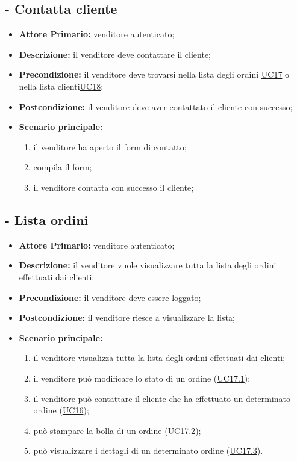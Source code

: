 
\stepUserCase
\subsection{ - Contatta cliente}
\begin{itemize}
    \item \textbf{Attore Primario:} venditore autenticato;
    \item \textbf{Descrizione:} il venditore deve contattare il cliente;
    \item \textbf{Precondizione:} il venditore deve trovarsi nella lista degli ordini \hyperref[UC17]{UC17} o nella lista clienti\hyperref[UC18]{UC18};
    \item \textbf{Postcondizione:} il venditore deve aver contattato il cliente con successo;
    \item \textbf{Scenario principale:}
    \begin{enumerate}
        \item il venditore ha aperto il form di contatto;
        \item compila il form;
        \item il venditore contatta con successo il cliente;
    \end{enumerate}
\end{itemize}

\stepUserCase
\subsection{ - Lista ordini}
\begin{itemize}
    \item \textbf{Attore Primario:} venditore autenticato;
    \item \textbf{Descrizione:} il venditore vuole visualizzare tutta la lista degli ordini effettuati dai clienti;
    \item \textbf{Precondizione:} il venditore deve essere loggato;
    \item \textbf{Postcondizione:} il venditore riesce a visualizzare la lista;
    \item \textbf{Scenario principale:}
    \begin{enumerate}
        \item il venditore visualizza tutta la lista degli ordini effettuati dai clienti;
        \item il venditore può modificare lo stato di un ordine (\hyperref[UC17.1]{UC17.1});
        \item il venditore può contattare il cliente che ha effettuato un determinato ordine (\hyperref[UC16]{UC16});
        \item può stampare la bolla di un ordine (\hyperref[UC17.2]{UC17.2});
        \item può visualizzare i dettagli di un determinato ordine (\hyperref[UC17.3]{UC17.3}).
    \end{enumerate}
\end{itemize}


